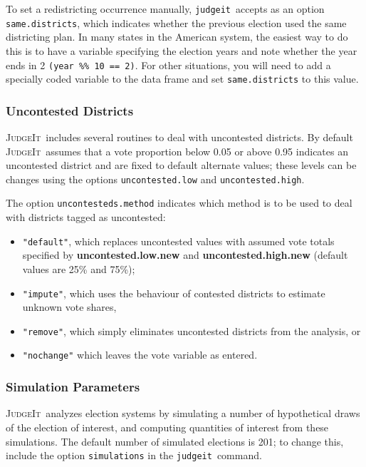 \documentclass[oneside,letterpaper,titlepage]{article}
\newcommand{\JudgeIt}{\textsc{JudgeIt}\ }
\newcommand{\jud}{\texttt{judgeit}\ }
\begin{document}
To set a redistricting occurrence manually, \jud accepts as an option \texttt{same.districts}, which indicates whether the previous election used the same districting plan. In many states in the American system, the easiest way to do this is to have a variable specifying the election years and note whether the year ends in 2 \texttt{(year \%\% 10 == 2)}.  For other situations, you will need to add a specially coded variable to the data frame and set \texttt{same.districts} to this value.

\subsubsection*{Uncontested Districts}

\JudgeIt includes several routines to deal with uncontested districts. By default \JudgeIt assumes that a vote proportion below 0.05 or above 0.95 indicates an uncontested district and are fixed to default alternate values; these levels can be changes using the options \texttt{uncontested.low} and \texttt{uncontested.high}.

The option \texttt{uncontesteds.method} indicates which method is to be used to deal with districts tagged as uncontested:

\begin{itemize}
\item \texttt{"default"}, which replaces uncontested values with assumed vote totals specified by \textbf{uncontested.low.new} and \textbf{uncontested.high.new} (default values are 25\% and 75\%);

\item \texttt{"impute"}, which uses the behaviour of contested districts to estimate unknown vote shares,

\item \texttt{"remove"}, which simply eliminates uncontested districts from the analysis, or

\item \texttt{"nochange"} which leaves the vote variable as entered.
\end{itemize}

\subsubsection*{Simulation Parameters}

\JudgeIt analyzes election systems by simulating a number of hypothetical draws of the election of interest, and computing quantities of interest from these simulations. The default number of simulated elections is 201; to change this, include the option \texttt{simulations} in the \jud command.
\end{document}
